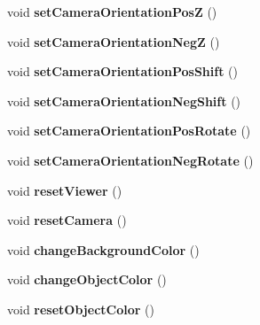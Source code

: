 \begin{DoxyCompactItemize}
\item 
void {\bfseries set\+Camera\+Orientation\+PosZ} ()\hypertarget{class_main_window_aa92b6d33b290f0be1c74d83bf2c20d20}{}\label{class_main_window_aa92b6d33b290f0be1c74d83bf2c20d20}

\item 
void {\bfseries set\+Camera\+Orientation\+NegZ} ()\hypertarget{class_main_window_a867a99f44d3f38b0fc273bb914123c5d}{}\label{class_main_window_a867a99f44d3f38b0fc273bb914123c5d}

\item 
void {\bfseries set\+Camera\+Orientation\+Pos\+Shift} ()\hypertarget{class_main_window_a9419db2007e9cb2fce7c47bad9a1e24d}{}\label{class_main_window_a9419db2007e9cb2fce7c47bad9a1e24d}

\item 
void {\bfseries set\+Camera\+Orientation\+Neg\+Shift} ()\hypertarget{class_main_window_a662365afb1e72acc14a3395454af2e53}{}\label{class_main_window_a662365afb1e72acc14a3395454af2e53}

\item 
void {\bfseries set\+Camera\+Orientation\+Pos\+Rotate} ()\hypertarget{class_main_window_a337c399d18112efcaaef73894041bbb7}{}\label{class_main_window_a337c399d18112efcaaef73894041bbb7}

\item 
void {\bfseries set\+Camera\+Orientation\+Neg\+Rotate} ()\hypertarget{class_main_window_a9aa0b2b560852435780f75c2b3f10f1f}{}\label{class_main_window_a9aa0b2b560852435780f75c2b3f10f1f}

\item 
void {\bfseries reset\+Viewer} ()\hypertarget{class_main_window_aad7276b3a2f667c813d8b4d00a6995d3}{}\label{class_main_window_aad7276b3a2f667c813d8b4d00a6995d3}

\item 
void {\bfseries reset\+Camera} ()\hypertarget{class_main_window_acdfade55a70d7cba0ba0dbea3d77d183}{}\label{class_main_window_acdfade55a70d7cba0ba0dbea3d77d183}

\item 
void {\bfseries change\+Background\+Color} ()\hypertarget{class_main_window_a1a7e2b9194e7134bca5fcf1dd4842a07}{}\label{class_main_window_a1a7e2b9194e7134bca5fcf1dd4842a07}

\item 
void {\bfseries change\+Object\+Color} ()\hypertarget{class_main_window_a8f203aed440e1d68f244dec9f45cfadc}{}\label{class_main_window_a8f203aed440e1d68f244dec9f45cfadc}

\item 
void {\bfseries reset\+Object\+Color} ()\hypertarget{class_main_window_a17bfb1a5680150f099064be820b950a8}{}\label{class_main_window_a17bfb1a5680150f099064be820b950a8}

\end{DoxyCompactItemize}
